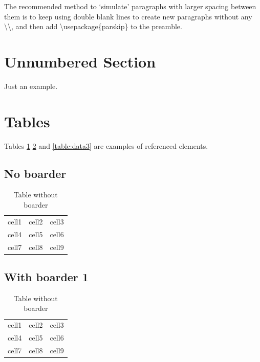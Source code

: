 \documentclass[12pt, letterpaper, twoside]{article}
\begin{document}
The recommended method to `simulate' paragraphs with larger spacing between them is to keep using double blank lines to create new paragraphs without any \textbackslash{}\textbackslash{}, and then add \textbackslash{}usepackage\{parskip\} to the preamble. 


\section*{Unnumbered Section}
Just an example.


\section{Tables}
Tables \ref{table:data1} \ref{table:data2} and \ref{table:data3} are examples of referenced elements.

\subsection{No boarder}
\begin{table}[h!]
\begin{center}
\begin{tabular}{ c c c }
 cell1 & cell2 & cell3 \\ 
 cell4 & cell5 & cell6 \\  
 cell7 & cell8 & cell9    
\end{tabular}
\end{center}
\caption{Table without boarder}
\label{table:data1}
\end{table}

\subsection{With boarder 1}
\begin{table}[h!]
\begin{center}
\begin{tabular}{ |c|c|c| } 
 \hline
 cell1 & cell2 & cell3 \\ 
 cell4 & cell5 & cell6 \\ 
 cell7 & cell8 & cell9 \\ 
 \hline
\end{tabular}
\end{center}
\caption{Table without boarder}
\label{table:data2}
\end{table}
\end{document}
